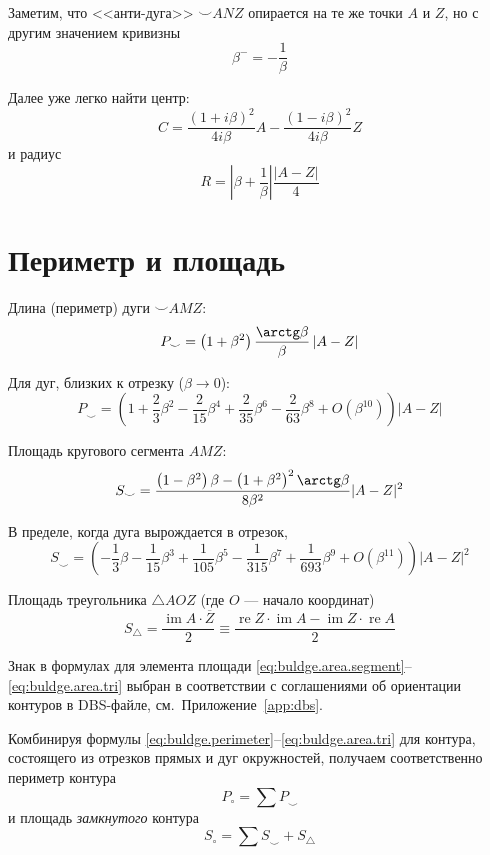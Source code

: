 Заметим, что <<анти-дуга>>
${\smile} ANZ$
опирается на те же точки
$A$ и $Z$,
но с другим значением кривизны
$$
\beta^- = -\frac{1}{\beta}
$$

Далее уже легко найти центр:
$$
C =
\frac{(1+i\beta)^2}{4i\beta}A
-
\frac{(1-i\beta)^2}{4i\beta}Z
$$
и радиус
$$
R = \left| \beta + \frac{1}\beta \right|
\frac{\left|A-Z \right|}4
$$

\section*{Периметр и площадь}

Длина
(периметр)
дуги
${\smile}AMZ$:
\begin{equation}
  \label{eq:buldge.perimeter}
  P_{\smile} =
  \left(1+\beta^2 \right)
  \frac{\arctg \beta}{\beta}
  \left| A - Z \right|
\end{equation}

Для дуг, близких к отрезку
($\beta \to 0$):
$$
P_{\smile} =
 \left(1+\frac{2}{3}\beta^2 - \frac{2}{15}\beta^4 + \frac{2}{35}\beta^6 - \frac{2}{63}\beta^8
 + O(\beta^{10})\right)
 \left| A - Z \right|
$$

Площадь кругового сегмента
$AMZ$:
\begin{equation}
  \label{eq:buldge.area.segment}
  S_{\smile}=
  \frac{\left(1 - \beta^2\right) \beta - \left(1+\beta^2\right)^2\arctg \beta}{8\beta^2}
  |A-Z|^2
\end{equation}

В пределе,
когда дуга вырождается в отрезок,
$$
S_{\smile}=
  \left(
    -\frac{1}{3} \beta - \frac{1}{15}\beta^3 +\frac{1}{105}\beta^5 - \frac{1}{315}\beta^7 + \frac{1}{693}\beta^9
    + O(\beta^{11})
  \right)|A-Z|^2
$$

Площадь треугольника
$\triangle AOZ$
(где $O$ --- начало координат)
\begin{equation}
  \label{eq:buldge.area.tri}
  S_{\triangle} =
  \frac{\operatorname{im}A\cdot\overline Z}{2}
  \equiv
  \frac{\operatorname{re} Z \cdot \operatorname{im} A - \operatorname{im} Z \cdot \operatorname{re} A}2
\end{equation}

Знак в формулах для элемента площади
\eqref{eq:buldge.area.segment}--\eqref{eq:buldge.area.tri}
выбран в соответствии с соглашениями об ориентации контуров
в DBS-файле,
см.~Приложение~\ref{app:dbs}.

Комбинируя формулы
\eqref{eq:buldge.perimeter}--\eqref{eq:buldge.area.tri}
для контура,
состоящего из отрезков прямых и дуг окружностей,
получаем соответственно периметр контура
$$
P_{\circ} =  \sum P_{\smile}
$$
и площадь
\textit{замкнутого}
контура
$$
S_{\circ} = \sum S_{\smile} + S_{\triangle}
$$

